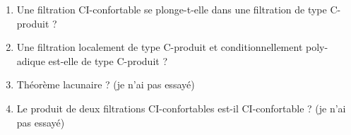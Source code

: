 \documentclass[12pt,a4paper]{article}
\begin{document}
\begin{enumerate}
\item Une filtration CI-confortable se plonge-t-elle dans une filtration de type 
C-produit ?

\item Une filtration localement de type C-produit et conditionnellement poly-adique 
est-elle de type C-produit ?

\item Théorème lacunaire ? (je n'ai pas essayé)

\item Le produit de deux filtrations CI-confortables est-il CI-confortable ? (je n'ai pas essayé) 
\end{enumerate}

\end{document}
